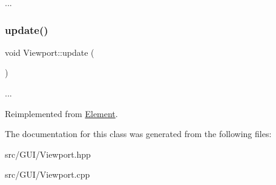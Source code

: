 ... \mbox{\label{class_viewport_a7997e0e684a4f8b5709f4d98be6cebb4}} 
\subsubsection{\texorpdfstring{update()}{update()}}
{\footnotesize\ttfamily void Viewport\+::update (\begin{DoxyParamCaption}{ }\end{DoxyParamCaption})\hspace{0.3cm}{\ttfamily [virtual]}}

... 

Reimplemented from \hyperlink{class_element_a35de04f6ab79440bb44083d8b300b87d}{Element}.



The documentation for this class was generated from the following files\+:\begin{DoxyCompactItemize}
\item 
src/\+G\+U\+I/Viewport.\+hpp\item 
src/\+G\+U\+I/Viewport.\+cpp\end{DoxyCompactItemize}
